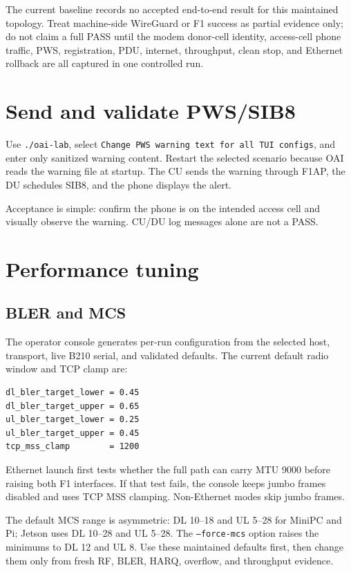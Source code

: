 \documentclass[11pt,a4paper]{article}
\begin{document}
The current baseline records no accepted end-to-end result for this maintained
topology. Treat machine-side WireGuard or F1 success as partial evidence only;
do not claim a full PASS until the modem donor-cell identity, access-cell phone
traffic, PWS, registration, PDU, internet, throughput, clean stop, and Ethernet
rollback are all captured in one controlled run.

\section{Send and validate PWS/SIB8}

Use \texttt{./oai-lab}, select \texttt{Change PWS warning text for all TUI
configs}, and enter only sanitized warning content. Restart the selected
scenario because OAI reads the warning file at startup. The CU sends the
warning through F1AP, the DU schedules SIB8, and the phone displays the alert.

Acceptance is simple: confirm the phone is on the intended access cell and
visually observe the warning. CU/DU log messages alone are not a PASS.

\section{Performance tuning}

\subsection{BLER and MCS}

The operator console generates per-run configuration from the selected host,
transport, live B210 serial, and validated defaults. The current default radio
window and TCP clamp are:

\begin{lstlisting}
dl_bler_target_lower = 0.45
dl_bler_target_upper = 0.65
ul_bler_target_lower = 0.25
ul_bler_target_upper = 0.45
tcp_mss_clamp        = 1200
\end{lstlisting}

Ethernet launch first tests whether the full path can carry MTU 9000 before
raising both F1 interfaces. If that test fails, the console keeps jumbo frames
disabled and uses TCP MSS clamping. Non-Ethernet modes skip jumbo frames.

The default MCS range is asymmetric: DL 10--18 and UL 5--28 for MiniPC and Pi;
Jetson uses DL 10--28 and UL 5--28. The \texttt{--force-mcs} option raises the
minimums to DL 12 and UL 8. Use these maintained defaults first, then change
them only from fresh RF, BLER, HARQ, overflow, and throughput evidence.
\end{document}
